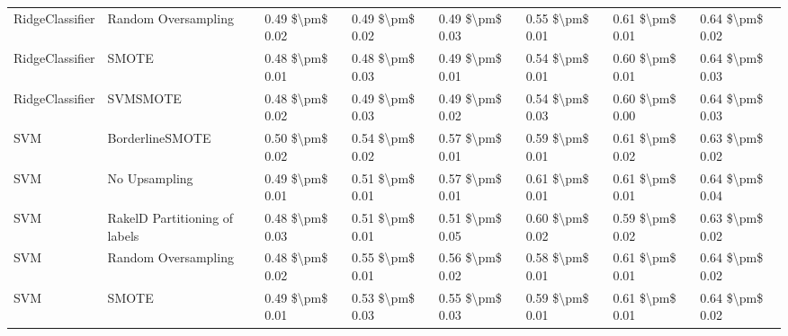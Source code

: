 \begin{tabular}{llllllll}
                RidgeClassifier &           Random Oversampling & 0.49 \$\textbackslash pm\$ 0.02 &           0.49 \$\textbackslash pm\$ 0.02 &       0.49 \$\textbackslash pm\$ 0.03 &        0.55 \$\textbackslash pm\$ 0.01 &                         0.61 \$\textbackslash pm\$ 0.01 &     0.64 \$\textbackslash pm\$ 0.02 \\
                RidgeClassifier &                         SMOTE & 0.48 \$\textbackslash pm\$ 0.01 &           0.48 \$\textbackslash pm\$ 0.03 &       0.49 \$\textbackslash pm\$ 0.01 &        0.54 \$\textbackslash pm\$ 0.01 &                         0.60 \$\textbackslash pm\$ 0.01 &     0.64 \$\textbackslash pm\$ 0.03 \\
                RidgeClassifier &                      SVMSMOTE & 0.48 \$\textbackslash pm\$ 0.02 &           0.49 \$\textbackslash pm\$ 0.03 &       0.49 \$\textbackslash pm\$ 0.02 &        0.54 \$\textbackslash pm\$ 0.03 &                         0.60 \$\textbackslash pm\$ 0.00 &     0.64 \$\textbackslash pm\$ 0.03 \\
                            SVM &               BorderlineSMOTE & 0.50 \$\textbackslash pm\$ 0.02 &           0.54 \$\textbackslash pm\$ 0.02 &       0.57 \$\textbackslash pm\$ 0.01 &        0.59 \$\textbackslash pm\$ 0.01 &                         0.61 \$\textbackslash pm\$ 0.02 &     0.63 \$\textbackslash pm\$ 0.02 \\
                            SVM &                 No Upsampling & 0.49 \$\textbackslash pm\$ 0.01 &           0.51 \$\textbackslash pm\$ 0.01 &       0.57 \$\textbackslash pm\$ 0.01 &        0.61 \$\textbackslash pm\$ 0.01 &                         0.61 \$\textbackslash pm\$ 0.01 &     0.64 \$\textbackslash pm\$ 0.04 \\
                            SVM & RakelD Partitioning of labels & 0.48 \$\textbackslash pm\$ 0.03 &           0.51 \$\textbackslash pm\$ 0.01 &       0.51 \$\textbackslash pm\$ 0.05 &        0.60 \$\textbackslash pm\$ 0.02 &                         0.59 \$\textbackslash pm\$ 0.02 &     0.63 \$\textbackslash pm\$ 0.02 \\
                            SVM &           Random Oversampling & 0.48 \$\textbackslash pm\$ 0.02 &           0.55 \$\textbackslash pm\$ 0.01 &       0.56 \$\textbackslash pm\$ 0.02 &        0.58 \$\textbackslash pm\$ 0.01 &                         0.61 \$\textbackslash pm\$ 0.01 &     0.64 \$\textbackslash pm\$ 0.02 \\
                            SVM &                         SMOTE & 0.49 \$\textbackslash pm\$ 0.01 &           0.53 \$\textbackslash pm\$ 0.03 &       0.55 \$\textbackslash pm\$ 0.03 &        0.59 \$\textbackslash pm\$ 0.01 &                         0.61 \$\textbackslash pm\$ 0.01 &     0.64 \$\textbackslash pm\$ 0.02 \\

\end{tabular}

